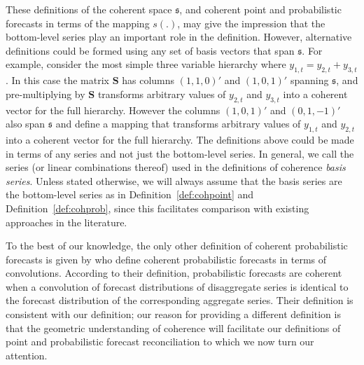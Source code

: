 \documentclass[12pt]{article}
\theoremstyle{definition}
\begin{document}
These definitions of the coherent space $\mathfrak{s}$, and coherent point and probabilistic forecasts in terms of the mapping $s(.)$, may give the impression that the bottom-level series play an important role in the definition. However, alternative definitions could be formed using any set of basis vectors that span $\mathfrak{s}$. For example, consider the most simple three variable hierarchy where $y_{1,t}=y_{2,t}+y_{3,t}$. In this case the matrix $\bm{S}$ has columns $(1,1,0)'$ and $(1,0,1)'$ spanning $\mathfrak{s}$, and pre-multiplying by $\bm{S}$ transforms arbitrary values of $y_{2,t}$ and $y_{3,t}$ into a coherent vector for the full hierarchy. However the columns $(1,0,1)'$ and $(0,1,-1)'$ also span $\mathfrak{s}$ and define a mapping that transforms arbitrary values of $y_{1,t}$ and $y_{2,t}$ into a coherent vector for the full hierarchy. The definitions above could be made in terms of any series and not just the bottom-level series. In general, we call the series (or linear combinations thereof) used in the definitions of coherence \textit{basis series}. Unless stated otherwise, we will always assume that the basis series are the bottom-level series as in Definition~\ref{def:cohpoint} and Definition~\ref{def:cohprob}, since this facilitates comparison with existing approaches in the literature.


To the best of our knowledge, the only other definition of coherent probabilistic forecasts is given by \citet{BenTaieb2017} who define coherent probabilistic forecasts in terms of convolutions. According to their definition, probabilistic forecasts are coherent when a convolution of forecast distributions of disaggregate series is identical to the forecast distribution of the corresponding aggregate series. Their definition is consistent with our definition; our reason for providing a different definition is that the geometric understanding of coherence will facilitate our definitions of point and probabilistic forecast reconciliation to which we now turn our attention.
\end{document}

